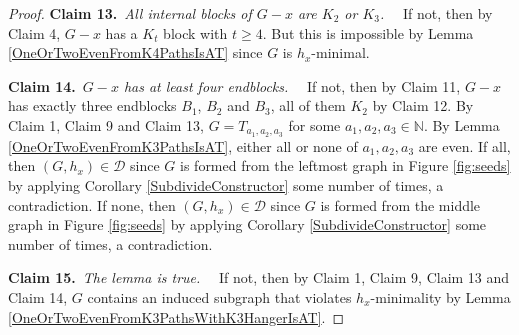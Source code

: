 \documentclass[12pt]{article}
\theoremstyle{plain}
\theoremstyle{definition}
\theoremstyle{remark}
\newcommand{\fancy}[1]{\mathcal{#1}}
\newcommand{\IN}{\mathbb{N}}
\newcommand{\D}{\fancy{D}}
\def\D{\fancy{D}}
\newcommand{\claim}[2]{{\bf Claim #1.}~{\it #2}~~}
\begin{document}
\begin{proof}
	 \claim{13}{All internal blocks of $G-x$ are $K_2$ or $K_3$.}
	  If not, then by Claim 4, $G-x$ has a $K_t$ block with $t \ge 4$.  But this is impossible by Lemma \ref{OneOrTwoEvenFromK4PathsIsAT} since $G$ is $h_x$-minimal.
	 
	 \claim{14}{$G-x$ has at least four endblocks.}
	  If not, then by Claim 11, $G-x$ has exactly three endblocks $B_1$, $B_2$ and $B_3$, all of them $K_2$ by Claim 12.  By Claim 1, Claim 9 and Claim 13, $G = T_{a_1,a_2,a_3}$ for some $a_1,a_2,a_3 \in \IN$.  By Lemma \ref{OneOrTwoEvenFromK3PathsIsAT}, either all or none of $a_1,a_2,a_3$ are even.  If all, then $(G, h_x) \in \D$ since $G$ is formed from the leftmost graph in Figure \ref{fig:seeds} by applying Corollary \ref{SubdivideConstructor} some number of times, a contradiction.  If none, then $(G, h_x) \in \D$ since $G$ is formed from the middle graph in Figure \ref{fig:seeds} by applying Corollary \ref{SubdivideConstructor} some number of times, a contradiction.
	  
	 \claim{15}{The lemma is true.}
	 If not, then by Claim 1, Claim 9, Claim 13 and Claim 14, $G$ contains an induced subgraph that violates $h_x$-minimality by Lemma \ref{OneOrTwoEvenFromK3PathsWithK3HangerIsAT}.
\end{proof}



\end{document}
